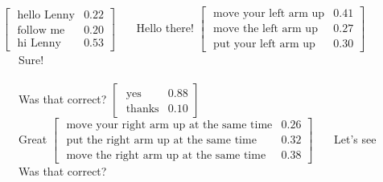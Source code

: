 \begin{Transcript}[p!]
\begin{dialogue} \vspace{3mm}
 $\begin{bmatrix}\text{ hello Lenny} & 0.22 \\
\text{ follow me} & 0.20 \\
\text{ hi Lenny} & 0.53 \end{bmatrix}$ \vspace{3mm}
 \ \ \ Hello there!\vspace{3mm}
 $\begin{bmatrix}\text{ move your left arm up} & 0.41 \\
\text{ move the left arm up} & 0.27 \\
\text{ put your left arm up} & 0.30 \end{bmatrix}$ \vspace{3mm}
 \ \ \ Sure! \vspace{2mm}\\
 \\
 \vspace{2mm}
 \ \ \ Was that correct? \vspace{3mm}
 $\begin{bmatrix}\text{ yes} & 0.88 \\
\text{ thanks} & 0.10 \end{bmatrix}$ \vspace{2mm} \\
 \vspace{3mm}
 \ \ \ Great \vspace{3mm}
 $\begin{bmatrix}\text{ move your right arm up at the same time} & 0.26 \\
\text{ put the right arm up at the same time} & 0.32 \\
\text{  move the right arm up at the same time} & 0.38 \end{bmatrix}$ \vspace{3mm}
 \ \ \ Let's see \vspace{1mm} \\
 \vspace{2mm}
 \ \ \ Was that correct? \vspace{3mm}

\end{dialogue}
\end{Transcript}
